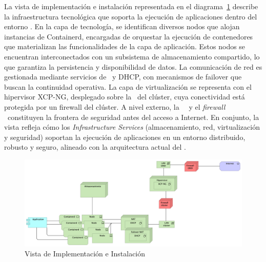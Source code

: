 La vista de implementación e instalación representada en el diagrama~\ref{fig:vista-implementacion-instalacion} describe la infraestructura tecnológica que soporta la ejecución de aplicaciones dentro del entorno \GRID. En la capa de tecnología, se identifican diversos nodos que alojan instancias de Containerd, encargadas de orquestar la ejecución de contenedores que materializan las funcionalidades de la capa de aplicación. Estos nodos se encuentran interconectados con un subsistema de almacenamiento compartido, lo que garantiza la persistencia y disponibilidad de datos. La comunicación de red es gestionada mediante servicios de \NAT\ y DHCP, con mecanismos de failover que buscan la continuidad operativa. La capa de virtualización se representa con el hipervisor XCP-NG, desplegado sobre la \LAN\ del clúster, cuya conectividad está protegida por un firewall del clúster. A nivel externo, la \LAN\ \GRID\ y el \textit{firewall} \GRID\ constituyen la frontera de seguridad antes del acceso a Internet. En conjunto, la vista refleja cómo los \textit{Infrastructure Services} (almacenamiento, red, virtualización y seguridad) soportan la ejecución de aplicaciones en un entorno distribuido, robusto y seguro, alineado con la arquitectura actual del \GRID.
\begin{figure}[H]
    \centering
    \includegraphics[width=\textwidth]{tablas-images/cp6/Implementation-and-Installation-View.png}
    \caption{Vista de Implementación e Instalación}\label{fig:vista-implementacion-instalacion}
\end{figure}
\noindent
